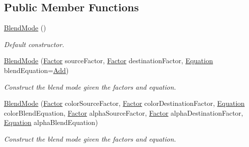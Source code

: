 \subsection*{Public Member Functions}
\begin{DoxyCompactItemize}
\item 
\mbox{\hyperlink{structsf_1_1_blend_mode_a7faef75eae1fb47bbe93f45f38e3d345}{Blend\+Mode}} ()
\begin{DoxyCompactList}\small\item\em Default constructor. \end{DoxyCompactList}\item 
\mbox{\hyperlink{structsf_1_1_blend_mode_a23c7452cc8e9eb943c3aea6234ce4297}{Blend\+Mode}} (\mbox{\hyperlink{structsf_1_1_blend_mode_afb9852caf356b53bb0de460c58a9ebbb}{Factor}} source\+Factor, \mbox{\hyperlink{structsf_1_1_blend_mode_afb9852caf356b53bb0de460c58a9ebbb}{Factor}} destination\+Factor, \mbox{\hyperlink{structsf_1_1_blend_mode_a7bce470e2e384c4f9c8d9595faef7c32}{Equation}} blend\+Equation=\mbox{\hyperlink{structsf_1_1_blend_mode_a7bce470e2e384c4f9c8d9595faef7c32a50c081d8f36cf7b77632966e15d38966}{Add}})
\begin{DoxyCompactList}\small\item\em Construct the blend mode given the factors and equation. \end{DoxyCompactList}\item 
\mbox{\hyperlink{structsf_1_1_blend_mode_a69a12c596114e77126616e7e0f7d798b}{Blend\+Mode}} (\mbox{\hyperlink{structsf_1_1_blend_mode_afb9852caf356b53bb0de460c58a9ebbb}{Factor}} color\+Source\+Factor, \mbox{\hyperlink{structsf_1_1_blend_mode_afb9852caf356b53bb0de460c58a9ebbb}{Factor}} color\+Destination\+Factor, \mbox{\hyperlink{structsf_1_1_blend_mode_a7bce470e2e384c4f9c8d9595faef7c32}{Equation}} color\+Blend\+Equation, \mbox{\hyperlink{structsf_1_1_blend_mode_afb9852caf356b53bb0de460c58a9ebbb}{Factor}} alpha\+Source\+Factor, \mbox{\hyperlink{structsf_1_1_blend_mode_afb9852caf356b53bb0de460c58a9ebbb}{Factor}} alpha\+Destination\+Factor, \mbox{\hyperlink{structsf_1_1_blend_mode_a7bce470e2e384c4f9c8d9595faef7c32}{Equation}} alpha\+Blend\+Equation)
\begin{DoxyCompactList}\small\item\em Construct the blend mode given the factors and equation. \end{DoxyCompactList}\end{DoxyCompactItemize}

